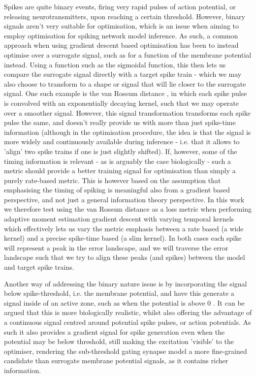 \documentclass[mphil,deptreport,ianc]{infthesis} %
\begin{document}
Spikes are quite binary events, firing very rapid pulses of action potential, or releasing neurotransmitters, upon reaching a certain threshold.
However, binary signals aren't very suitable for optimisation, which is an issue when aiming to employ optimisation for spiking network model inference. 
As such, a common approach when using gradient descent based optimisation has been to instead optimise over a surrogate signal, such as for a function of the membrane potential instead. Using a function such as the sigmoidal function, this then lets us compare the surrogate signal directly with a target spike train - which we may also choose to transform to a shape or signal that will lie closer to the surrogate signal.
One such example is the van Rossum distance \cite{VanRossum2001}, in which each spike pulse is convolved with an exponentially decaying kernel, such that we may operate over a smoother signal. 
However, this signal transformation transforms each spike pulse the same, and doesn't really provide us with more than just spike-time information (although in the optimisation procedure, the idea is that the signal is more widely and continuously available during inference - i.e. that it allows to 'align' two spike trains if one is just slightly shifted).
If, however, some of the timing information is relevant - as is arguably the case biologically - such a metric should provide a better training signal for optimisation than simply a purely rate-based metric.
This is however based on the assumption that emphasising the timing of spiking is meaningful also from a gradient based perspective, and not just a general information theory perspective.
In this work we therefore test using the van Rossum distance as a loss metric when performing adaptive moment estimation gradient descent with varying temporal kernels which effectively lets us vary the metric emphasis between a rate based (a wide kernel) and a precise spike-time based (a slim kernel). In both cases each spike will represent a peak in the error landscape, and we will traverse the error landscape such that we try to align these peaks (and spikes) between the model and target spike trains.

Another way of addressing the binary nature issue is by incorporating the signal below spike-threshold, i.e. the membrane potential, and have this generate a signal inside of an active zone, such as when the potential is above 0 \cite{Huh2017}. 
It can be argued that this is more biologically realistic, whilst also offering the advantage of a continuous signal centred around potential spike pulses, or action potentials. 
As such it also provides a gradient signal for spike generation even when the potential may be below threshold, still making the excitation 'visible' to the optimiser, rendering the sub-threshold gating synapse model a more fine-grained candidate than surrogate membrane potential signals, as it contains richer information.
\end{document}
